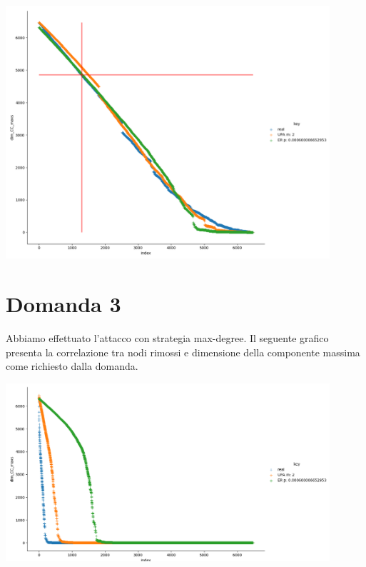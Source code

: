 \documentclass{article}
\begin{document}
\includegraphics[width=0.9\textwidth]{Figure_2}

\section{Domanda 3}
Abbiamo effettuato l'attacco con strategia max-degree. Il seguente grafico presenta la correlazione tra nodi rimossi e dimensione della componente massima come richiesto dalla domanda.

\includegraphics[width=0.9\textwidth]{Figure_3}
\end{document}
